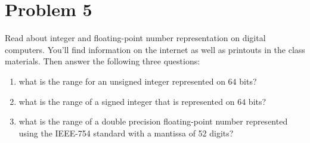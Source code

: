 \section{Problem 5}%
\label{sec:problem_5}
Read about integer and floating-point number representation on digital computers. You'll find information on the internet as well as printouts in the class materials. Then answer the following three questions:
\begin{enumerate}
  \item what is the range for an unsigned integer represented on $64$ bits?
  \item what is the range of a signed integer that is represented on $64$ bits?
  \item what is the range of a double precision floating-point number represented using the IEEE-754 standard with a mantissa of 52 digits?
\end{enumerate}
\begin{solution}
  \quad
  
\end{solution}
